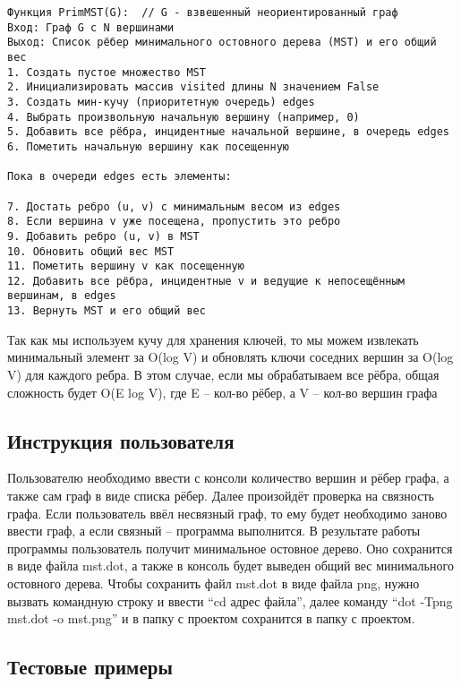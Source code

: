 \documentclass[a4paper,16pt]{article}
\begin{document}
\begin{verbatim}
Функция PrimMST(G):  // G - взвешенный неориентированный граф
Вход: Граф G с N вершинами
Выход: Список рёбер минимального остовного дерева (MST) и его общий вес
1. Создать пустое множество MST
2. Инициализировать массив visited длины N значением False
3. Создать мин-кучу (приоритетную очередь) edges
4. Выбрать произвольную начальную вершину (например, 0)
5. Добавить все рёбра, инцидентные начальной вершине, в очередь edges
6. Пометить начальную вершину как посещенную

Пока в очереди edges есть элементы:
	
7. Достать ребро (u, v) с минимальным весом из edges
8. Если вершина v уже посещена, пропустить это ребро
9. Добавить ребро (u, v) в MST
10. Обновить общий вес MST
11. Пометить вершину v как посещенную
12. Добавить все рёбра, инцидентные v и ведущие к непосещённым вершинам, в edges
13. Вернуть MST и его общий вес

\end{verbatim}

Так как мы используем кучу для хранения ключей, то мы можем извлекать минимальный элемент за O(log V) и обновлять ключи соседних вершин за O(log V) для каждого ребра. В этом случае, если мы обрабатываем все рёбра, общая сложность будет O(E log V), где E – кол-во рёбер, а V – кол-во вершин графа

\newpage 

\begin{center}
   \section{Инструкция пользователя} 
\end{center}

Пользователю необходимо ввести с консоли количество вершин и рёбер графа, а также сам граф в виде списка рёбер. Далее произойдёт проверка на связность графа. Если пользователь ввёл несвязный граф, то ему будет необходимо заново ввести граф, а если связный – программа выполнится. В результате работы программы пользователь получит минимальное остовное дерево. Оно сохранится в виде файла mst.dot, а также в консоль будет выведен общий вес минимального остовного дерева. Чтобы сохранить файл mst.dot в виде файла png, нужно вызвать командную строку и ввести “cd адрес файла”, далее команду “dot -Tpng mst.dot -o mst.png” и в папку с проектом сохранится в папку с проектом.

\newpage
\begin{center}
   \section{Тестовые примеры} 
\end{center}
\end{document}

